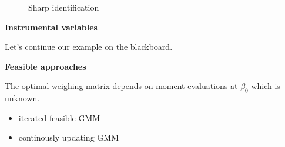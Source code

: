 \begin{frame}
\begin{figure}[htp]\centering
\caption{Sharp identification}
\end{figure}
\end{frame}
\begin{frame}\textbf{Instrumental variables}\vspace{1cm}

\begin{center}
Let's continue our example on the blackboard.
\end{center}

\end{frame}
\begin{frame}\textbf{Feasible approaches}\vspace{1cm}

The optimal weighing matrix depends on moment evaluations at $\beta_0$ which is unknown.\\

\begin{itemize}\setlength\itemsep{1em}
\item iterated feasible GMM
\item continously updating GMM
\end{itemize}
\end{frame}
